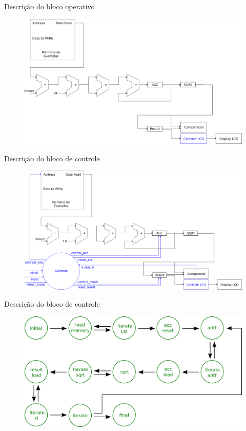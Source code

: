 \documentclass[11pt]{beamer}
\begin{document}
\begin{frame}{Descrição do bloco operativo}
	\begin{figure}[ht]
	\centering
	\includegraphics[width=1.0\textwidth]{knn_sem_controle}
	\label{fig:knn_sem_controle}
	\end{figure}
\end{frame}

\begin{frame}{Descrição do bloco de controle}
	\begin{figure}[ht]
	\centering
	\includegraphics[width=1.0\textwidth]{knn}
	\label{fig:knncalc}
	\end{figure}
\end{frame}

\begin{frame}{Descrição do bloco de controle}
	\begin{figure}[ht]
	\centering
	\includegraphics[width=1.0\textwidth]{control_unit}
	\label{fig:control_unit}
	\end{figure}
\end{frame}
\end{document}
